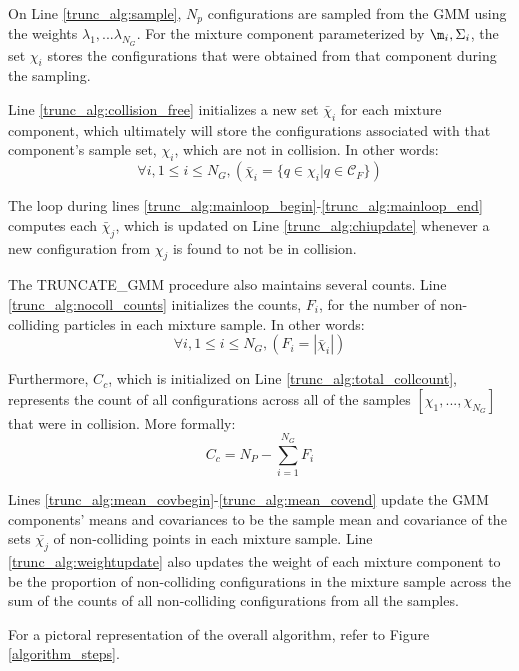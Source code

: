 \documentclass[journal]{IEEEtran}
\begin{document}
On Line \ref{trunc_alg:sample}, $N_p$ configurations are sampled from the GMM using the weights $\lambda_1,...\lambda_{N_G}$. For the mixture component parameterized by $\m_i, \Sigma_i$, the set $\chi_i$ stores the configurations that were obtained from that component during the sampling.

Line \ref{trunc_alg:collision_free} initializes a new set $\bar{\chi}_i$ for each mixture component, which ultimately will store the configurations associated with that component's sample set, $\chi_i$, which are not in collision. In other words:
$$\forall i, 1 \leq i \leq N_{G}, ( \bar{\chi}_i  = \{q \in \chi_i | q \in \mathcal{C}_F \})$$

The loop during lines \ref{trunc_alg:mainloop_begin}-\ref{trunc_alg:mainloop_end} computes each $\bar{\chi}_j$, which is updated on Line \ref{trunc_alg:chiupdate} whenever a new configuration from $\chi_j$ is found to not be in collision.

The TRUNCATE\_GMM procedure also maintains several counts. Line \ref{trunc_alg:nocoll_counts} initializes the counts, $F_i$, for the number of non-colliding particles in each mixture sample. In other words:
$$\forall i, 1 \leq i \leq N_{G}, ( F_i = |\bar{\chi}_i|)$$

Furthermore, $C_c$, which is initialized on Line \ref{trunc_alg:total_collcount}, represents the count of all configurations across all of the samples $[\chi_1,...,\chi_{N_G}]$ that were in collision. More formally:
$$C_c = N_{P} - \sum_{i=1}^{N_G}F_i$$

Lines \ref{trunc_alg:mean_covbegin}-\ref{trunc_alg:mean_covend} update the GMM components' means and covariances to be the sample mean and covariance of the sets $\bar{\chi_j}$ of non-colliding points in each mixture sample. Line \ref{trunc_alg:weightupdate} also updates the weight of each mixture component to be the proportion of non-colliding configurations in the mixture sample across the sum of the counts of all non-colliding configurations from all the samples.

For a pictoral representation of the overall algorithm, refer to Figure \ref{algorithm_steps}.


\end{document}
